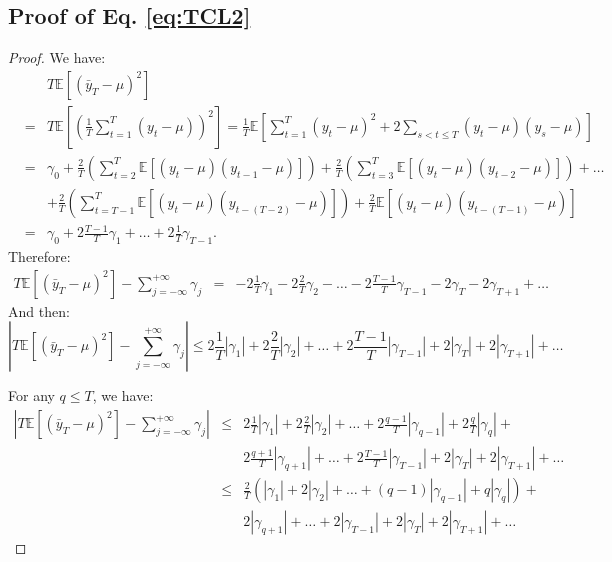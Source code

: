 \documentclass[
]{book}
\theoremstyle{definition}
\theoremstyle{definition}
\theoremstyle{definition}
\theoremstyle{definition}
\theoremstyle{remark}
\begin{document}
\hypertarget{proofTVTCL}{%
\subsection{Proof of Eq. \eqref{eq:TCL2}}\label{proofTVTCL}}

\begin{proof}
We have:
\begin{eqnarray*}
&&T\mathbb{E}\left[(\bar{y}_T - \mu)^2\right]\\
&=& T\mathbb{E}\left[\left(\frac{1}{T}\sum_{t=1}^T(y_t - \mu)\right)^2\right] = \frac{1}{T} \mathbb{E}\left[\sum_{t=1}^T(y_t - \mu)^2+2\sum_{s<t\le T}(y_t - \mu)(y_s - \mu)\right]\\
&=& \gamma_0 +\frac{2}{T}\left(\sum_{t=2}^{T}\mathbb{E}\left[(y_t - \mu)(y_{t-1} - \mu)\right]\right) +\frac{2}{T}\left(\sum_{t=3}^{T}\mathbb{E}\left[(y_t - \mu)(y_{t-2} - \mu)\right]\right) + \dots \\
&&+ \frac{2}{T}\left(\sum_{t=T-1}^{T}\mathbb{E}\left[(y_t - \mu)(y_{t-(T-2)} - \mu)\right]\right) + \frac{2}{T}\mathbb{E}\left[(y_t - \mu)(y_{t-(T-1)} - \mu)\right]\\
&=&  \gamma_0 + 2 \frac{T-1}{T}\gamma_1 + \dots + 2 \frac{1}{T}\gamma_{T-1} .
\end{eqnarray*}
Therefore:
\begin{eqnarray*}
T\mathbb{E}\left[(\bar{y}_T - \mu)^2\right] - \sum_{j=-\infty}^{+\infty} \gamma_j &=& - 2\frac{1}{T}\gamma_1 - 2\frac{2}{T}\gamma_2 - \dots - 2\frac{T-1}{T}\gamma_{T-1} - 2\gamma_T - 2 \gamma_{T+1} + \dots
\end{eqnarray*}
And then:
\[
\left|T\mathbb{E}\left[(\bar{y}_T - \mu)^2\right] - \sum_{j=-\infty}^{+\infty} \gamma_j\right| \le 2\frac{1}{T}|\gamma_1| + 2\frac{2}{T}|\gamma_2| + \dots + 2\frac{T-1}{T}|\gamma_{T-1}| + 2|\gamma_T| + 2 |\gamma_{T+1}| + \dots
\]

For any \(q \le T\), we have:
\begin{eqnarray*}
\left|T\mathbb{E}\left[(\bar{y}_T - \mu)^2\right] - \sum_{j=-\infty}^{+\infty} \gamma_j\right| &\le& 2\frac{1}{T}|\gamma_1| + 2\frac{2}{T}|\gamma_2| + \dots + 2\frac{q-1}{T}|\gamma_{q-1}| +2\frac{q}{T}|\gamma_q| +\\
&&2\frac{q+1}{T}|\gamma_{q+1}| + \dots  + 2\frac{T-1}{T}|\gamma_{T-1}| + 2|\gamma_T| + 2 |\gamma_{T+1}| + \dots\\
&\le& \frac{2}{T}\left(|\gamma_1| + 2|\gamma_2| + \dots + (q-1)|\gamma_{q-1}| +q|\gamma_q|\right) +\\
&&2|\gamma_{q+1}| + \dots  + 2|\gamma_{T-1}| + 2|\gamma_T| + 2 |\gamma_{T+1}| + \dots
\end{eqnarray*}


\end{proof}
\end{document}
